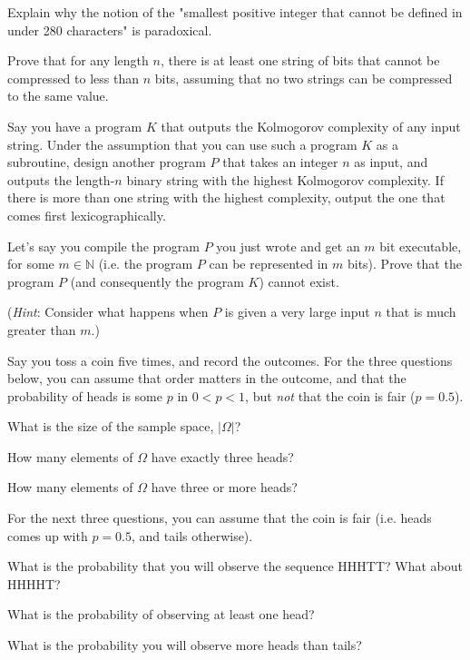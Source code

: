 \documentclass[11pt]{article}
\begin{document}
\begin{Parts}

\Part
Explain why the notion of the "smallest positive integer that cannot be defined in under 280 characters" is paradoxical.

\Part
Prove that for any length $n$, there is at least one string of bits that cannot be compressed to less than $n$ bits, assuming that no two strings can be compressed to the same value.

\Part
Say you have a program $K$ that outputs the Kolmogorov complexity of any input
string. Under the assumption that you can use such a program $K$ as a
subroutine, design another program $P$ that takes an integer $n$ as input, and
outputs the length-$n$ binary string with the highest Kolmogorov complexity. If
there is more than one string with the highest complexity, output the one that
comes first lexicographically.

\Part
Let's say you compile the program $P$ you just wrote and get an $m$ bit
executable, for some $m \in \mathbb N$ (i.e. the program $P$ can be represented
in $m$ bits). Prove that the program $P$ (and consequently the program $K$)
cannot exist.

(\textit{Hint}: Consider what happens when $P$ is given a very large input $n$ that is much greater than $m$.)

 

\end{Parts}


Say you toss a coin five times, and record the outcomes. For the three questions
below, you can assume that order matters in the outcome, and that the
probability of heads is some $p$ in $0 < p < 1$, but \textit{not} that the coin
is fair ($p = 0.5$).

\begin{Parts}
\Part What is the size of the sample space, $|\Omega|$?

\Part How many elements of $\Omega$ have exactly three heads?

\Part How many elements of $\Omega$ have three or more heads?
\end{Parts}

For the next three questions, you can assume that the coin is fair (i.e. heads 
comes up with $p=0.5$, and tails otherwise).

\begin{Parts}[resume]
\Part What is the probability that you will observe the sequence HHHTT? What 
about HHHHT?

\Part What is the probability of observing at least one head?

\Part What is the probability you will observe more heads than tails?

\end{Parts}
\end{document}
